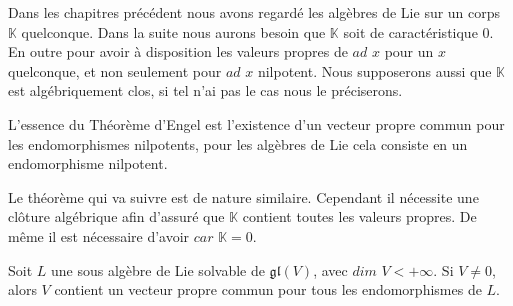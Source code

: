 \documentclass[a4paper,openany,12pt]{report}
\newcommand{\KK}{\mathbb{K}}
\newcommand{\gl}{\mathfrak{gl}}
\theoremstyle{break}
{\theorembodyfont{\upshape}
\newtheorem*{rmq}{Remarque :}
\newtheorem*{prv}{Preuve :}
\newtheorem*{ex}{Exemples :}
\newtheorem*{exe}{Exemple : }
\newtheorem*{nota}{Notation :}
\newtheorem*{dem}{D\'emonstration :}}
\begin{document}
Dans les chapitres précédent nous avons regardé les algèbres de Lie sur un corps $\KK$ quelconque. Dans la suite nous aurons besoin que $\KK$ soit de caractéristique $0$. En outre pour avoir à disposition les valeurs propres de $ad$ $x$ pour un $x$ quelconque, et non seulement pour $ad$ $x$ nilpotent. Nous supposerons aussi que $\KK$ est algébriquement clos, si tel n'ai pas le cas nous le préciserons.

L'essence du Théorème d'Engel est l’existence d'un vecteur propre commun pour les endomorphismes nilpotents, pour les algèbres de Lie cela consiste en un endomorphisme nilpotent.

Le théorème qui va suivre est de nature similaire. Cependant il nécessite une clôture algébrique afin d'assuré que $\KK$ contient toutes les valeurs propres. De même il est nécessaire d'avoir $car$ $\KK =0$.

\begin{thm}\label{thm:L1}
\quad Soit $L$ une sous algèbre de Lie solvable de $\gl(V)$, avec $dim$ $V < +\infty$. Si $V \neq 0$, alors $V$ contient un vecteur propre commun pour tous les endomorphismes de $L$.
\end{thm}
\end{document}
